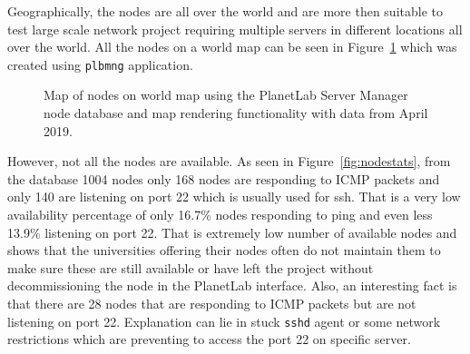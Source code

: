 {{{{{{{Geographically, the nodes are all over the world and are more then suitable to test large scale network project requiring multiple servers in different locations all over the world. All the nodes on a world map can be seen in Figure~\ref{fig:allnodes} which was created using \texttt{plbmng} application.

\begin{figure}[H]
	\centering
	\caption{Map of nodes on world map using the PlanetLab Server Manager node database and map rendering functionality with data from April 2019.}
	\label{fig:allnodes}
\end{figure}

However, not all the nodes are available. As seen in Figure~\ref{fig:nodestats}, from the database 1004 nodes only 168 nodes are responding to ICMP packets and only 140 are listening on port 22 which is usually used for ssh. That is a very low availability percentage of only 16.7\% nodes responding to ping and even less 13.9\% listening on port 22. That is extremely low number of available nodes and shows that the universities offering their nodes often do not maintain them to make sure these are still available or have left the project without decommissioning the node in the PlanetLab interface. Also, an interesting fact is that there are 28 nodes that are responding to ICMP packets but are not listening on port 22. Explanation can lie in stuck \texttt{sshd} agent or some network restrictions which are preventing to access the port 22 on specific server.

}}}}}}}

